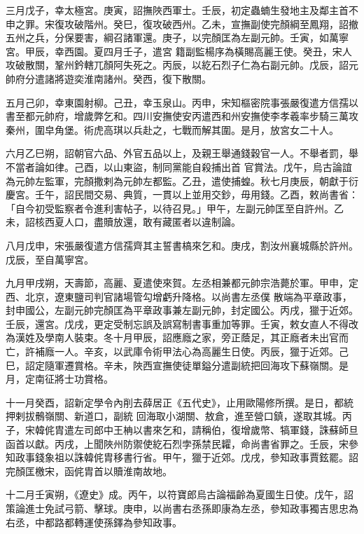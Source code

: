 \begin{pinyinscope}
 三月戊子，幸太極宮。庚寅，詔撫陜西軍士。壬辰，初定蟲蝻生發地主及鄰主首不申之罪。宋復攻破階州。癸巳，復攻破西州。乙未，宣撫副使完顏綱至鳳翔，詔撤五州之兵，分保要害，綱召諸軍還。庚子，以完顏匡為左副元帥。壬寅，如萬寧宮。甲辰，幸西園。夏四月壬子，遣宮
 籍副監楊序為橫賜高麗王使。癸丑，宋人攻破散關，鞏州鈐轄兀顏阿失死之。丙辰，以紇石烈子仁為右副元帥。戊辰，詔元帥府分遣諸將遊奕淮南諸州。癸西，復下散關。



 五月己卯，幸東園射柳。己丑，幸玉泉山。丙申，宋知樞密院事張嚴復遣方信孺以書至都元帥府，增歲弊乞和。四川安撫使安丙遣西和州安撫使李孝羲率步騎三萬攻秦州，圍皁角堡。術虎高琪以兵赴之，七戰而解其圍。是月，放宮女二十人。



 六月乙巳朔，詔朝官六品、外官五品以上，及親王舉通錢穀官一人。不舉者罰，舉不當者論如律。己酉，以山東盜，制同黨能自殺捕出首
 官賞法。戊午，烏古論誼為元帥左監軍，完顏撒剌為元帥左都監。乙丑，遣使捕蝗。秋七月庚辰，朝獻于衍慶宮。壬午，詔民間交易、典質，一貫以上並用交鈔，毋用錢。乙酉，敕尚書省：「自今初受監察者令進利害帖子，以待召見。」甲午，左副元帥匡至自許州。乙未，詔核西夏人口，盡贖放還，敢有藏匿者以違制論。



 八月戊申，宋張嚴復遣方信孺齊其主誓書槁來乞和。庚戌，割汝州襄城縣於許州。戊辰，至自萬寧宮。



 九月甲戌朔，天壽節，高麗、夏遣使來賀。左丞相兼都元帥宗浩薨於軍。甲申，定西、北京，遼東鹽司判官諸場管勾增虧升降格。以尚書左丞僕
 散端為平章政事，封申國公，左副元帥完顏匡為平章政事兼左副元帥，封定國公。丙戌，獵于近郊。壬辰，還宮。戊戌，更定受制忘誤及誤寫制書事重加等罪。壬寅，敕女直人不得改為漢姓及學南人裝束。冬十月甲辰，詔應廕之家，旁正蔭足，其正廕者未出官而亡，許補廕一人。辛亥，以武庫令術甲法心為高麗生日使。丙辰，獵于近郊。己巳，詔定隨軍遷賞格。辛未，陜西宣撫使徒單鎰分遣副統把回海攻下蘇嶺關。是月，定南征將士功賞格。



 十一月癸酉，詔新定學令內削去薛居正《五代史》，止用歐陽修所撰。是日，都統押剌拔鶻嶺關、新道口，副統
 回海取小湖關、敖倉，進至營口鎮，遂取其城。丙子，宋韓侂胄遣左司郎中王柟以書來乞和，請稱伯，復增歲幣、犒軍錢，誅蘇師旦函首以獻。丙戌，上聞陜州防禦使紇石烈孛孫禁民糶，命尚書省罪之。壬辰，宋參知政事錢象祖以誅韓侂胄移書行省。甲午，獵于近郊。戊戌，參知政事賈鉉罷。詔完顏匡檄宋，函侂胄首以贖淮南故地。



 十二月壬寅朔，《遼史》成。丙午，以符寶郎烏古論福齡為夏國生日使。戊午，詔策論進士免試弓箭、擊球。庚申，以尚書右丞孫即康為左丞，參知政事獨吉思忠為右丞，中都路都轉運使孫鐸為參知政事。




\end{pinyinscope}
